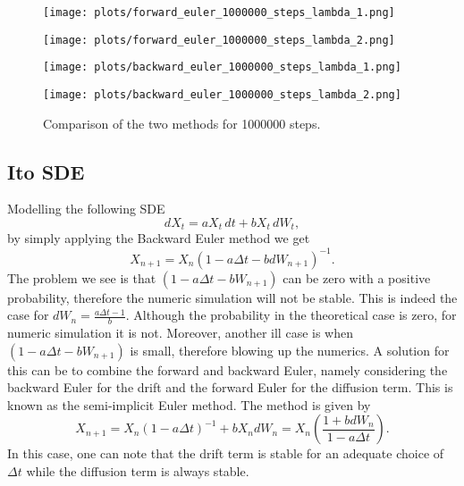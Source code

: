 \documentclass[a4paper,12pt]{article} %
\begin{document}
\begin{figure}[H]
    \centering
    \begin{minipage}{0.45\textwidth}
        \centering
        \texttt{[image: plots/forward\_euler\_1000000\_steps\_lambda\_1.png]}
    \end{minipage}
    \hfill
    \begin{minipage}{0.45\textwidth}
        \centering
        \texttt{[image: plots/forward\_euler\_1000000\_steps\_lambda\_2.png]}
    \end{minipage}

    \vspace{0.5cm}

    \begin{minipage}{0.45\textwidth}
        \centering
        \texttt{[image: plots/backward\_euler\_1000000\_steps\_lambda\_1.png]}
    \end{minipage}
    \hfill
    \begin{minipage}{0.45\textwidth}
        \centering
        \texttt{[image: plots/backward\_euler\_1000000\_steps\_lambda\_2.png]}
    \end{minipage}

    \caption{Comparison of the two methods for 1000000 steps.}
\end{figure}


\newpage
\subsection{Ito SDE}
Modelling the following SDE
\begin{equation}
    dX_t = a X_t \, dt + b X_t \, dW_t,
\end{equation}
by simply applying the Backward Euler method we get
\begin{equation}
    X_{n+1} = X_n (1 - a \Delta t - b dW_{n+1} )^{-1}.
\end{equation}
The problem we see is that \( (1 - a \Delta t - b W_{n+1} )\) can be zero with a positive probability, therefore the numeric simulation will not be stable. This is indeed the case for \(dW_n =  \frac{a \Delta t -1}{b}\). Although the probability in the theoretical case is zero, for numeric simulation it is not. Moreover, another ill case is when \((1 - a \Delta t - b W_{n+1} )\) is small, therefore blowing up the numerics.
A solution for this can be to combine the forward and backward Euler, namely considering the backward Euler for the drift and the forward Euler for the diffusion term. This is known as the semi-implicit Euler method. The method is given by
\begin{equation}
    X_{n+1} = X_n (1 - a \Delta t)^{-1} + b X_n dW_n  = X_{n} \left( \frac{1+bdW_n}{1-a \Delta t} \right)  .
\end{equation}
In this case, one can note that the drift term is stable for an adequate choice of \(\Delta t\) while the diffusion term is always stable.
\end{document}
